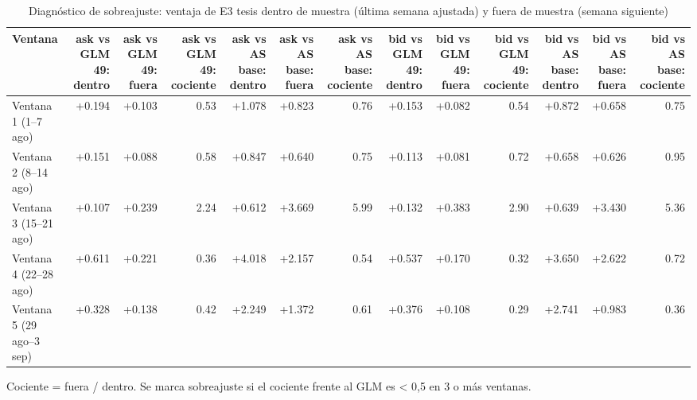 \begin{table}[htbp]
\centering
\small
\caption{Diagnóstico de sobreajuste: ventaja de E3 tesis dentro de muestra (última semana ajustada) y fuera de muestra (semana siguiente)}
\label{tab:T3_sobreajuste}
\begin{tabular}{lrrrrrrrrrrrr}
\toprule
Ventana & ask vs GLM 49: dentro & ask vs GLM 49: fuera & ask vs GLM 49: cociente & ask vs AS base: dentro & ask vs AS base: fuera & ask vs AS base: cociente & bid vs GLM 49: dentro & bid vs GLM 49: fuera & bid vs GLM 49: cociente & bid vs AS base: dentro & bid vs AS base: fuera & bid vs AS base: cociente \\
\midrule
Ventana 1 (1–7 ago) & +0.194 & +0.103 & 0.53 & +1.078 & +0.823 & 0.76 & +0.153 & +0.082 & 0.54 & +0.872 & +0.658 & 0.75 \\
Ventana 2 (8–14 ago) & +0.151 & +0.088 & 0.58 & +0.847 & +0.640 & 0.75 & +0.113 & +0.081 & 0.72 & +0.658 & +0.626 & 0.95 \\
Ventana 3 (15–21 ago) & +0.107 & +0.239 & 2.24 & +0.612 & +3.669 & 5.99 & +0.132 & +0.383 & 2.90 & +0.639 & +3.430 & 5.36 \\
Ventana 4 (22–28 ago) & +0.611 & +0.221 & 0.36 & +4.018 & +2.157 & 0.54 & +0.537 & +0.170 & 0.32 & +3.650 & +2.622 & 0.72 \\
Ventana 5 (29 ago–3 sep) & +0.328 & +0.138 & 0.42 & +2.249 & +1.372 & 0.61 & +0.376 & +0.108 & 0.29 & +2.741 & +0.983 & 0.36 \\
\bottomrule
\end{tabular}
\par\smallskip\footnotesize Cociente = fuera / dentro. Se marca sobreajuste si el cociente frente al GLM es < 0,5 en 3 o más ventanas.
\end{table}
